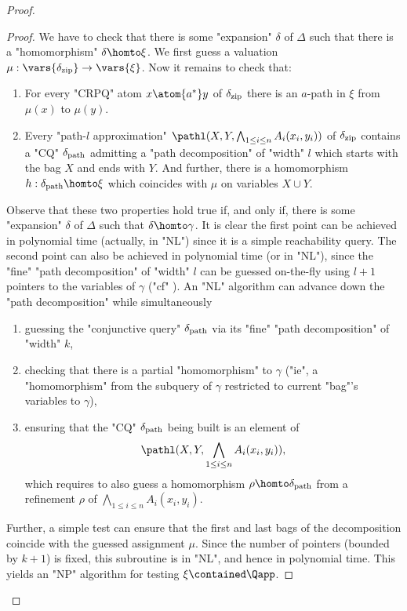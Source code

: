 \begin{proof}
\begin{proof}
        We have to check that there is some "expansion" $\delta$ of $\Delta$ such that there is a "homomorphism" $\delta \homto \xi$. 
        We first guess a valuation $\mu :  \vars{\delta_{\textup{zip}}} \to \vars{\xi}$.
        Now it remains to check that:
        \begin{enumerate}
          \item For every "CRPQ" atom $x \atom{a^*} y$ of $\delta_{\textup{zip}}$ there is an $a$-path in $\xi$ from $\mu(x)$ to $\mu(y)$.
          \item Every "path-$l$ approximation" $\pathl(X, Y, \bigwedge_{1 \leq i \leq n} A_i(x_i,y_i))$ of $\delta_{\textup{zip}}$ contains a "CQ" $\delta_{\textup{path}}$  admitting a "path decomposition" of "width" $l$ which starts with the bag $X$ and ends with $Y$. And further, there is a homomorphism $h: \delta_{\textup{path}}  \homto \xi$ which coincides with $\mu$ on variables $X \cup Y$.
        \end{enumerate}
        Observe that  these two properties hold true if, and only if, there is some "expansion" $\delta$ of $\Delta$ such that $\delta \homto \gamma$.
        It is clear the first point can be achieved in polynomial time (actually, in "NL") since it is a simple reachability query. 
        The second point can also be achieved in polynomial time (or in "NL"), since the "fine" "path decomposition" of "width" $l$ can be guessed on-the-fly using $l+1$ pointers to the variables of $\gamma$ ("cf" ). An "NL" algorithm can advance down the "path decomposition" while simultaneously
        \begin{enumerate}
          \item guessing the "conjunctive query" $\delta_{\textup{path}}$ via its "fine" "path decomposition" of "width" $k$,
          \item checking that there is a partial "homomorphism" to $\gamma$ ("ie", a "homomorphism" from the subquery of $\gamma$ restricted to current "bag"'s variables to $\gamma$),
          \item ensuring that the "CQ" $\delta_{\textup{path}}$ being built is an element of
		  \[\pathl(X, Y, \bigwedge_{1 \leq i \leq n} A_i(x_i,y_i)),\] which requires to also guess a homomorphism $\rho \homto \delta_{\textup{path}}$ from a refinement $\rho$ of $\bigwedge_{1 \leq i \leq n} A_i(x_i,y_i)$.
        \end{enumerate}
        Further, a simple test can ensure that the first and last bags of the decomposition  coincide with the guessed assignment $\mu$.
        Since the number of pointers (bounded by $k+1$) is fixed, this subroutine is in "NL", and hence in polynomial time. This yields an "NP" algorithm for testing $\xi \contained \Qapp$.
  \end{proof}



\end{proof}
